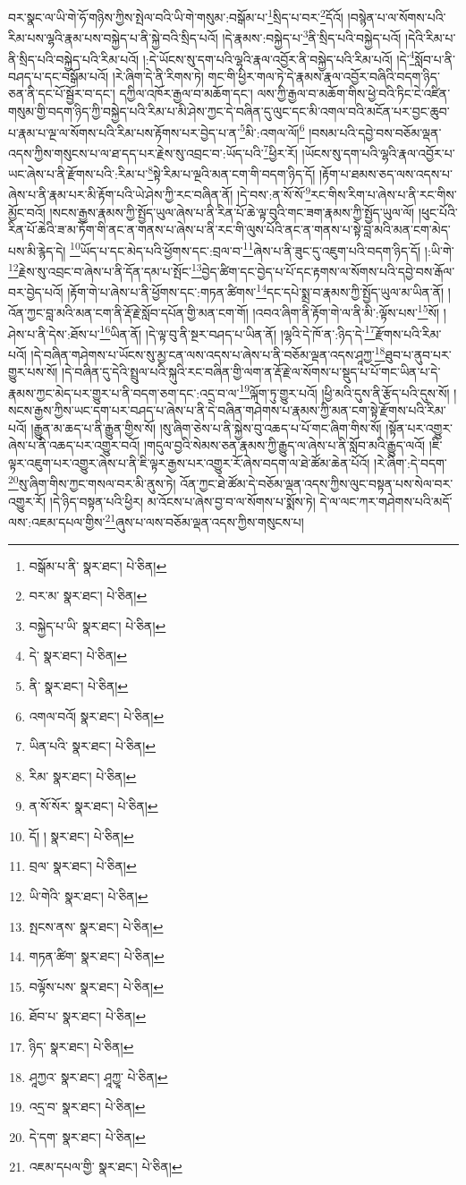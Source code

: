 བར་སྣང་ལ་ཡི་གེ་ཧོ་གཉིས་ཀྱིས་སྤེལ་བའི་ཡི་གེ་གསུམ་:བསྒོམ་པ་\footnote{བསྒོམ་པ་ནི་  སྣར་ཐང་།  པེ་ཅིན། }སྲིད་པ་བར་\footnote{བར་མ་  སྣར་ཐང་།  པེ་ཅིན། }དོའོ། །བསྙེན་པ་ལ་སོགས་པའི་རིམ་པས་ལྷའི་རྣམ་པས་བསྐྱེད་པ་ནི་སྐྱེ་བའི་སྲིད་པའོ། །དེ་རྣམས་:བསྐྱེད་པ་\footnote{བསྐྱེད་པ་ཡི་  སྣར་ཐང་།  པེ་ཅིན། }ནི་སྲིད་པའི་བསྐྱེད་པའོ། །དེའི་རིམ་པ་ནི་སྲིད་པའི་བསྐྱེད་པའི་རིམ་པའོ། །:དེ་ཡོངས་སུ་དག་པའི་ལྷའི་རྣལ་འབྱོར་ནི་བསྐྱེད་པའི་རིམ་པའོ། །དེ་\footnote{དེ་  སྣར་ཐང་།  པེ་ཅིན། }སློབ་པ་ནི་བཤད་པ་དང་བསྒོམ་པའོ། །རེ་ཞིག་དེ་ནི་རིགས་ཏེ། གང་གི་ཕྱིར་གལ་ཏེ་དེ་རྣམས་རྣལ་འབྱོར་བཞིའི་བདག་ཉིད་ཅན་ནི་དང་པོ་སྦྱོར་བ་དང་། དཀྱིལ་འཁོར་རྒྱལ་བ་མཆོག་དང་། ལས་ཀྱི་རྒྱལ་བ་མཆོག་གིས་ཕྱེ་བའི་ཏིང་ངེ་འཛིན་གསུམ་གྱི་བདག་ཉིད་ཀྱི་བསྐྱེད་པའི་རིམ་པ་མི་ཤེས་ཀྱང་དེ་བཞིན་དུ་ལུང་དང་མི་འགལ་བའི་མངོན་པར་བྱང་ཆུབ་པ་རྣམ་པ་ལྔ་ལ་སོགས་པའི་རིམ་པས་རྟོགས་པར་བྱེད་པ་ན་\footnote{ནི་  སྣར་ཐང་།  པེ་ཅིན། }མི་:འགལ་ལོ།\footnote{འགལ་བའོ།  སྣར་ཐང་།  པེ་ཅིན། } །བསམ་པའི་དབྱེ་བས་བཅོམ་ལྡན་འདས་ཀྱིས་གསུངས་པ་ལ་ཐ་དད་པར་རྗེས་སུ་འབྲང་བ་:ཡོད་པའི་\footnote{ཡིན་པའི་  སྣར་ཐང་།  པེ་ཅིན། }ཕྱིར་རོ། །ཡོངས་སུ་དག་པའི་ལྷའི་རྣལ་འབྱོར་པ་ཡང་ཞེས་པ་ནི་རྫོགས་པའི་:རིམ་པ་\footnote{རིམ་  སྣར་ཐང་།  པེ་ཅིན། }སྟེ་རིམ་པ་ལྔའི་མན་ངག་གི་བདག་ཉིད་དོ། །རྟོག་པ་ཐམས་ཅད་ལས་འདས་པ་ཞེས་པ་ནི་རྣམ་པར་མི་རྟོག་པའི་ཡེ་ཤེས་ཀྱི་རང་བཞིན་ནོ། །དེ་བས་:ན་སོ་སོ་\footnote{ན་སོ་སོར་  སྣར་ཐང་།  པེ་ཅིན། }རང་གིས་རིག་པ་ཞེས་པ་ནི་རང་གིས་མྱོང་བའོ། །སངས་རྒྱས་རྣམས་ཀྱི་སྤྱོད་ཡུལ་ཞེས་པ་ནི་རིན་པོ་ཆེ་ལྟ་བུའི་གང་ཟག་རྣམས་ཀྱི་སྤྱོད་ཡུལ་ལོ། །ཕུང་པོའི་རིན་པོ་ཆེའི་ཟ་མ་ཏོག་གི་ནང་ན་གནས་པ་ཞེས་པ་ནི་རང་གི་ལུས་པོའི་ནང་ན་གནས་པ་སྟེ་བླ་མའི་མན་ངག་མེད་པས་མི་རྙེད་དེ། \footnote{དོ། །   སྣར་ཐང་།  པེ་ཅིན། }ཡོད་པ་དང་མེད་པའི་ཕྱོགས་དང་:བྲལ་བ་\footnote{བྲལ་  སྣར་ཐང་།  པེ་ཅིན། }ཞེས་པ་ནི་ཟུང་དུ་འཇུག་པའི་བདག་ཉིད་དོ། །:ཡི་གེ་\footnote{ཡི་གེའི་  སྣར་ཐང་།  པེ་ཅིན། }རྗེས་སུ་འབྲང་བ་ཞེས་པ་ནི་དོན་དམ་པ་སྤོང་\footnote{སྤངས་ནས་  སྣར་ཐང་།  པེ་ཅིན། }བྱེད་ཚིག་དང་བྱེད་པ་པོ་དང་རྟགས་ལ་སོགས་པའི་དབྱེ་བས་རྒོལ་བར་བྱེད་པའོ། །རྟོག་གེ་པ་ཞེས་པ་ནི་ཕྱོགས་དང་:གཏན་ཚིགས་\footnote{གཏན་ཚིག་  སྣར་ཐང་།  པེ་ཅིན། }དང་དཔེ་སྨྲ་བ་རྣམས་ཀྱི་སྤྱོད་ཡུལ་མ་ཡིན་ནོ། །འོན་ཀྱང་བླ་མའི་མན་ངག་ནི་རྡོ་རྗེ་སློབ་དཔོན་གྱི་མན་ངག་གོ། །འབའ་ཞིག་ནི་རྟོག་གེ་ལ་ནི་མི་:ལྟོས་པས་\footnote{བལྟོས་པས་  སྣར་ཐང་།  པེ་ཅིན། }སོ། །ཤེས་པ་ནི་དེས་:ཐོས་པ་\footnote{ཐོབ་པ་  སྣར་ཐང་།  པེ་ཅིན། }ཡིན་ནོ། །དེ་ལྟ་བུ་ནི་སྔར་བཤད་པ་ཡིན་ནོ། །ལྷའི་དེ་ཁོ་ན་:ཉིད་དེ་\footnote{ཉིད་  སྣར་ཐང་།  པེ་ཅིན། }རྫོགས་པའི་རིམ་པའོ། །དེ་བཞིན་གཤེགས་པ་ཡོངས་སུ་མྱ་ངན་ལས་འདས་པ་ཞེས་པ་ནི་བཅོམ་ལྡན་འདས་ཤཱཀྱ་\footnote{ཤཱཀྱའ་  སྣར་ཐང་། ཤཱཀྱཱ་  པེ་ཅིན། }ཐུབ་པ་ནུབ་པར་གྱུར་པས་སོ། །དེ་བཞིན་དུ་དེའི་སྤྲུལ་པའི་སྐུའི་རང་བཞིན་གྱི་ལག་ན་རྡོ་རྗེ་ལ་སོགས་པ་སྡུད་པ་པོ་གང་ཡིན་པ་དེ་རྣམས་ཀྱང་མེད་པར་གྱུར་པ་ནི་བདག་ཅག་དང་:འདྲ་བ་ལ་\footnote{འདྲ་བ་  སྣར་ཐང་།  པེ་ཅིན། }ལྐོག་ཏུ་གྱུར་པའོ། །ཕྱི་མའི་དུས་ནི་རྩོད་པའི་དུས་སོ། །སངས་རྒྱས་ཀྱིས་ཡང་དག་པར་བཤད་པ་ཞེས་པ་ནི་དེ་བཞིན་གཤེགས་པ་རྣམས་ཀྱི་མན་ངག་སྟེ་རྫོགས་པའི་རིམ་པའོ། །རྒྱུན་མ་ཆད་པ་ནི་རྒྱུན་གྱིས་སོ། །སུ་ཞིག་ཅེས་པ་ནི་སྐྱེས་བུ་འཆད་པ་པོ་གང་ཞིག་གིས་སོ། །སྟོན་པར་འགྱུར་ཞེས་པ་ནི་འཆད་པར་འགྱུར་བའོ། །གདུལ་བྱའི་སེམས་ཅན་རྣམས་ཀྱི་རྒྱུད་ལ་ཞེས་པ་ནི་སློབ་མའི་རྒྱུད་ལའོ། །ཇི་ལྟར་འཇུག་པར་འགྱུར་ཞེས་པ་ནི་ཇི་ལྟར་རྒྱས་པར་འགྱུར་རོ་ཞེས་བདག་ལ་ཐེ་ཚོམ་ཆེན་པོའོ། །རེ་ཞིག་:དེ་བདག་\footnote{དེ་དག་  སྣར་ཐང་།  པེ་ཅིན། }སུ་ཞིག་གིས་ཀྱང་གསལ་བར་མི་ནུས་ཏེ། འོན་ཀྱང་ཐེ་ཚོམ་དེ་བཅོམ་ལྡན་འདས་ཀྱིས་ལུང་བསྟན་པས་སེལ་བར་འགྱུར་རོ། །དེ་ཉིད་བསྟན་པའི་ཕྱིར། མ་འོངས་པ་ཞེས་བྱ་བ་ལ་སོགས་པ་སྨོས་ཏེ། དེ་ལ་ལང་ཀར་གཤེགས་པའི་མདོ་ལས་:འཇམ་དཔལ་གྱིས་\footnote{འཇམ་དཔལ་གྱི་  སྣར་ཐང་།  པེ་ཅིན། }ཞུས་པ་ལས་བཅོམ་ལྡན་འདས་ཀྱིས་གསུངས་པ། 